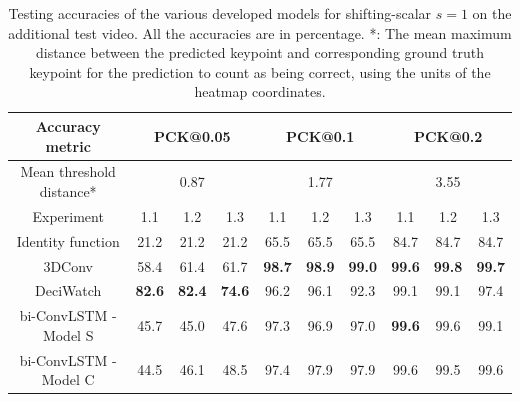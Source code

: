 \documentclass[./main.tex]{subfiles}
\begin{document}
\begin{table}[htbp]
    \begin{tabular}{c||ccc|ccc|ccc}
        \hline
        Accuracy metric & \multicolumn{3}{c}{PCK@0.05} & \multicolumn{3}{c}{PCK@0.1} & \multicolumn{3}{c}{PCK@0.2} \\
        \hline
        Mean threshold distance* & \multicolumn{3}{c}{0.87} & \multicolumn{3}{c}{1.77} & \multicolumn{3}{c}{3.55} \\
        \hline
        Experiment & 1.1 & 1.2 & 1.3 & 1.1 & 1.2 & 1.3 & 1.1 & 1.2 & 1.3 \\
        \hline
        \hline
        Identity function & 21.2 & 21.2 & 21.2 & 65.5 & 65.5 & 65.5 & 84.7 & 84.7 & 84.7 \\
        3DConv & 58.4 & 61.4 & 61.7 & \textbf{98.7} & \textbf{98.9} & \textbf{99.0} & \textbf{99.6} & \textbf{99.8} & \textbf{99.7} \\
        DeciWatch & \textbf{82.6} & \textbf{82.4} & \textbf{74.6} & 96.2 & 96.1 & 92.3 & 99.1 & 99.1 & 97.4 \\
        bi-ConvLSTM - Model S & 45.7 & 45.0 & 47.6 & 97.3 & 96.9 & 97.0 & \textbf{99.6} & 99.6 & 99.1 \\
        bi-ConvLSTM - Model C & 44.5 & 46.1 & 48.5 & 97.4 & 97.9 & 97.9 & 99.6 & 99.5 & 99.6 \\
        \hline
    \end{tabular}
    \caption{Testing accuracies of the various developed models for shifting-scalar $s = 1$ on the additional test video. All the accuracies are in percentage. *: The mean maximum distance between the predicted keypoint and corresponding ground truth keypoint for the prediction to count as being correct, using the units of the heatmap coordinates.}
    \label{tab:finetune_test_accs_3}
\end{table}
\end{document}
